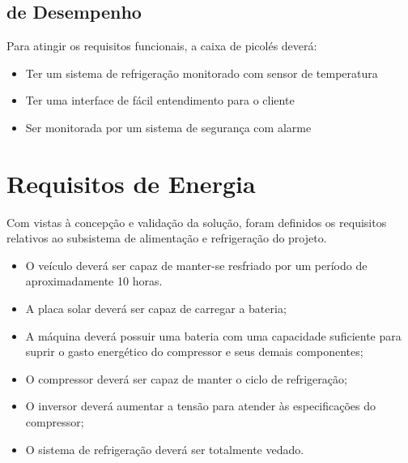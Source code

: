 \subsection{de Desempenho}
Para atingir os requisitos funcionais, a caixa de picolés deverá:
\begin{itemize}
\item  Ter um sistema de refrigeração monitorado com sensor de temperatura
\item  Ter uma interface de fácil entendimento para o cliente
\item  Ser monitorada por um sistema de segurança com alarme
\end{itemize}

\section{Requisitos de Energia}

Com vistas à concepção e validação da solução, foram definidos os requisitos relativos ao subsistema de alimentação e refrigeração do projeto.

	\begin{itemize}

	
   \item O veículo deverá ser capaz de manter-se resfriado por um período de aproximadamente 10 horas.
   
   \item A placa solar deverá ser capaz de carregar a bateria;
   
   \item A máquina deverá possuir uma bateria com uma capacidade suficiente para suprir o gasto energético do compressor e seus demais componentes;
   
   \item O compressor deverá ser capaz de manter o ciclo de refrigeração;
   
   \item O inversor deverá aumentar a tensão para atender às especificações do compressor;
   
   \item O sistema de refrigeração deverá ser totalmente vedado.
   \end{itemize}